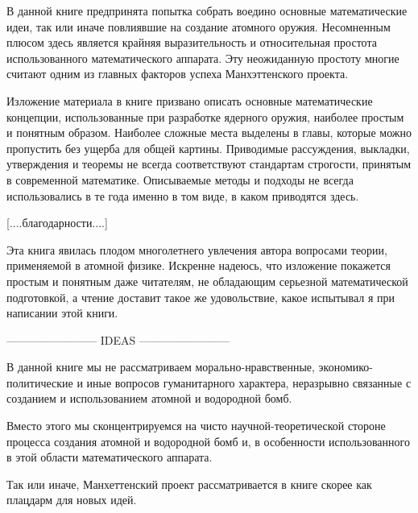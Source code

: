 В данной книге предпринята попытка собрать воедино основные математические идеи, так или иначе повлиявшие на создание атомного оружия.
Несомненным плюсом здесь является крайняя выразительность и относительная простота использованного математического аппарата. 
Эту неожиданную простоту многие считают одним из главных факторов успеха Манхэттенского проекта.

Изложение материала в книге призвано описать основные математические концепции, использованные при разработке ядерного оружия, наиболее простым и понятным образом. 
Наиболее сложные места выделены в главы, которые можно пропустить без ущерба для общей картины.
Приводимые рассуждения, выкладки, утверждения и теоремы не всегда соответствуют стандартам строгости, принятым в современной математике.
Описываемые методы и подходы не всегда использовались в те года именно в том виде, в каком приводятся здесь.

[....благодарности....]

Эта книга явилась плодом многолетнего увлечения автора вопросами теории, применяемой в атомной физике. 
Искренне надеюсь, что изложение покажется простым и понятным даже читателям, не обладающим серьезной математической подготовкой, а чтение доставит такое же удовольствие, какое испытывал я при написании этой книги.


------------------------ IDEAS ------------------------ 

В данной книге мы не рассматриваем морально-нравственные, экономико-политические и иные вопросов гуманитарного характера, неразрывно связанные с созданием и использованием атомной и водородной бомб.


Вместо этого мы сконцентрируемся на чисто научной-теоретической стороне процесса создания атомной и водородной бомб и, в особенности использованного в этой области математического аппарата.

Так или иначе, Манхеттенский проект рассматривается в книге скорее как плацдарм для новых идей.










